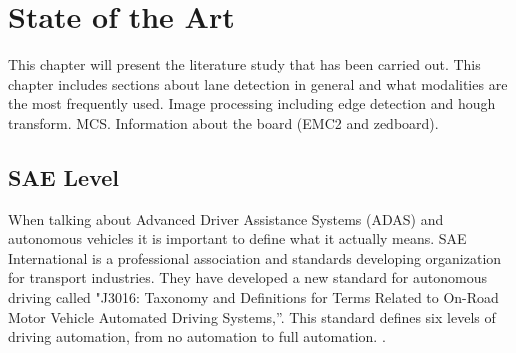 \chapter{State of the Art}
This chapter will present the literature study that has been carried out. This chapter includes sections about
lane detection in general and what modalities are the most frequently used. Image processing including edge detection and hough transform. MCS. Information about the board  (EMC2 and zedboard).

\section{SAE Level}
When talking about Advanced Driver Assistance Systems (ADAS) and autonomous vehicles it is important to define what it actually means. SAE International is a professional association and standards developing organization for transport industries. They have developed a new standard for autonomous driving called  "J3016: Taxonomy and Definitions for Terms Related to On-Road Motor Vehicle Automated Driving Systems,”. This standard defines six levels of driving automation, from no automation to full automation. \cite{SAE} \cite{SAEweb}. 


